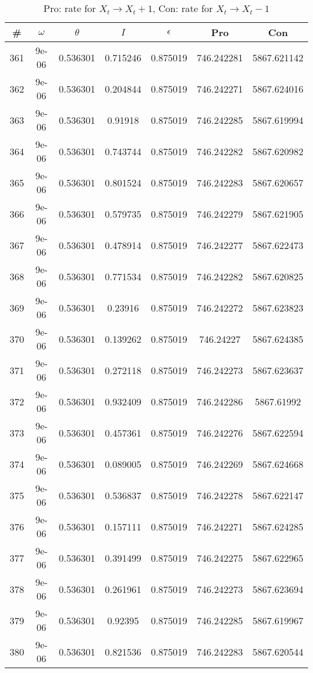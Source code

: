 \newpage
\begin{table}
\caption{Pro: rate for $X_t \rightarrow X_t + 1$, Con: rate for $X_t \rightarrow X_t - 1$}
\begin{tabular*}{\linewidth}{c|c|c|c|c|c|c}
\# & $\omega$ & $\theta$ & $I$ & $\epsilon$ & Pro & Con \\
\hline
361 & 9e-06 & 0.536301 & 0.715246 & 0.875019 & 746.242281 & 5867.621142\\
362 & 9e-06 & 0.536301 & 0.204844 & 0.875019 & 746.242271 & 5867.624016\\
363 & 9e-06 & 0.536301 & 0.91918 & 0.875019 & 746.242285 & 5867.619994\\
364 & 9e-06 & 0.536301 & 0.743744 & 0.875019 & 746.242282 & 5867.620982\\
365 & 9e-06 & 0.536301 & 0.801524 & 0.875019 & 746.242283 & 5867.620657\\
366 & 9e-06 & 0.536301 & 0.579735 & 0.875019 & 746.242279 & 5867.621905\\
367 & 9e-06 & 0.536301 & 0.478914 & 0.875019 & 746.242277 & 5867.622473\\
368 & 9e-06 & 0.536301 & 0.771534 & 0.875019 & 746.242282 & 5867.620825\\
369 & 9e-06 & 0.536301 & 0.23916 & 0.875019 & 746.242272 & 5867.623823\\
370 & 9e-06 & 0.536301 & 0.139262 & 0.875019 & 746.24227 & 5867.624385\\
371 & 9e-06 & 0.536301 & 0.272118 & 0.875019 & 746.242273 & 5867.623637\\
372 & 9e-06 & 0.536301 & 0.932409 & 0.875019 & 746.242286 & 5867.61992\\
373 & 9e-06 & 0.536301 & 0.457361 & 0.875019 & 746.242276 & 5867.622594\\
374 & 9e-06 & 0.536301 & 0.089005 & 0.875019 & 746.242269 & 5867.624668\\
375 & 9e-06 & 0.536301 & 0.536837 & 0.875019 & 746.242278 & 5867.622147\\
376 & 9e-06 & 0.536301 & 0.157111 & 0.875019 & 746.242271 & 5867.624285\\
377 & 9e-06 & 0.536301 & 0.391499 & 0.875019 & 746.242275 & 5867.622965\\
378 & 9e-06 & 0.536301 & 0.261961 & 0.875019 & 746.242273 & 5867.623694\\
379 & 9e-06 & 0.536301 & 0.92395 & 0.875019 & 746.242285 & 5867.619967\\
380 & 9e-06 & 0.536301 & 0.821536 & 0.875019 & 746.242283 & 5867.620544\\

\end{tabular*}
\end{table}
